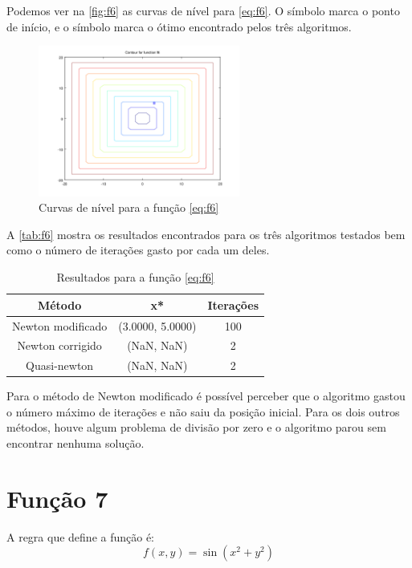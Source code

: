 \documentclass[12pt]{article}
\begin{document}
Podemos ver na \autoref{fig:f6} as curvas de nível para \autoref{eq:f6}. O símbolo \textit{\textopenbullet} marca o ponto de início,
e o símbolo \textit{\texttimes} marca o ótimo encontrado pelos três algoritmos.

\begin{figure}[H]
  \centering
  \includegraphics[width=250px]{../matlab/images/f6_contour}
  \caption{Curvas de nível para a função \autoref{eq:f6}}
  \label{fig:f6}
\end{figure}

A \autoref{tab:f6} mostra os resultados encontrados para os três algoritmos testados bem como o número de iterações gasto por cada um deles.

\begin{table}[H]
\centering
\begin{tabular}{*3c}
\toprule
Método			&	x*		&	Iterações\\
\midrule
Newton modificado	&	(3.0000, 5.0000)	&	100\\
Newton corrigido	&	(NaN, NaN)		&	2\\
Quasi-newton		&	(NaN, NaN)		&	2\\
\bottomrule
\end{tabular}
\caption{\small{Resultados para a função \autoref{eq:f6} }}
\label{tab:f6}
\end{table}

Para o método de Newton modificado é possível perceber que o algoritmo gastou o número máximo de iterações e não saiu da posição inicial.
Para os dois outros métodos, houve algum problema de divisão por zero e o algoritmo parou sem encontrar nenhuma solução.



\section{Função 7}
A regra que define a função é:
\begin{equation}
\label{eq:f7}
f(x, y) = \sin(x^2 + y^2)
\end{equation}
\end{document}
